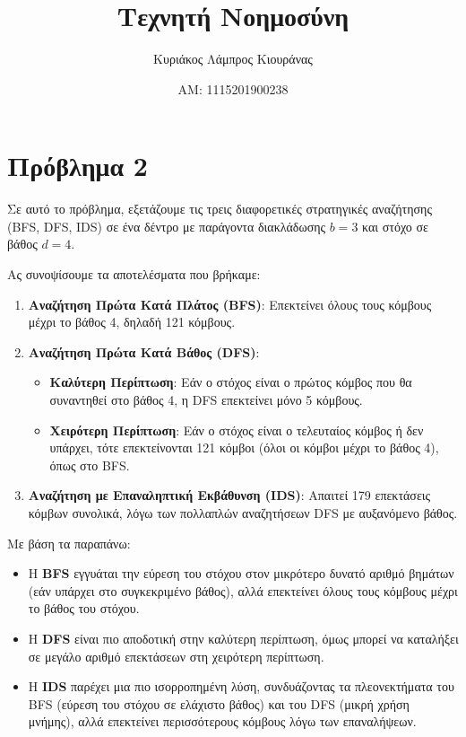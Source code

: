 \documentclass{article}
\title{Τεχνητή Νοημοσύνη}
\author{Κυριάκος Λάμπρος Κιουράνας}
\date{ΑΜ: 1115201900238}
\begin{document}
\maketitle

\section*{Πρόβλημα 2}

Σε αυτό το πρόβλημα, εξετάζουμε τις τρεις διαφορετικές στρατηγικές αναζήτησης (BFS, DFS, IDS) σε ένα δέντρο με παράγοντα διακλάδωσης \( b = 3 \) και στόχο σε βάθος \( d = 4 \).

Ας συνοψίσουμε τα αποτελέσματα που βρήκαμε:

\begin{enumerate}
    \item \textbf{Αναζήτηση Πρώτα Κατά Πλάτος (BFS)}: Επεκτείνει όλους τους κόμβους μέχρι το βάθος 4, δηλαδή 121 κόμβους.
    \item \textbf{Αναζήτηση Πρώτα Κατά Βάθος (DFS)}:
    \begin{itemize}
        \item \textbf{Καλύτερη Περίπτωση}: Εάν ο στόχος είναι ο πρώτος κόμβος που θα συναντηθεί στο βάθος 4, η DFS επεκτείνει μόνο 5 κόμβους.
        \item \textbf{Χειρότερη Περίπτωση}: Εάν ο στόχος είναι ο τελευταίος κόμβος ή δεν υπάρχει, τότε επεκτείνονται 121 κόμβοι (όλοι οι κόμβοι μέχρι το βάθος 4), όπως στο BFS.
    \end{itemize}
    \item \textbf{Αναζήτηση με Επαναληπτική Εκβάθυνση (IDS)}: Απαιτεί 179 επεκτάσεις κόμβων συνολικά, λόγω των πολλαπλών αναζητήσεων DFS με αυξανόμενο βάθος.
\end{enumerate}

Με βάση τα παραπάνω:
\begin{itemize}
    \item Η \textbf{BFS} εγγυάται την εύρεση του στόχου στον μικρότερο δυνατό αριθμό βημάτων (εάν υπάρχει στο συγκεκριμένο βάθος), αλλά επεκτείνει όλους τους κόμβους μέχρι το βάθος του στόχου.
    \item Η \textbf{DFS} είναι πιο αποδοτική στην καλύτερη περίπτωση, όμως μπορεί να καταλήξει σε μεγάλο αριθμό επεκτάσεων στη χειρότερη περίπτωση.
    \item Η \textbf{IDS} παρέχει μια πιο ισορροπημένη λύση, συνδυάζοντας τα πλεονεκτήματα του BFS (εύρεση του στόχου σε ελάχιστο βάθος) και του DFS (μικρή χρήση μνήμης), αλλά επεκτείνει περισσότερους κόμβους λόγω των επαναλήψεων.
\end{itemize}
\end{document}
